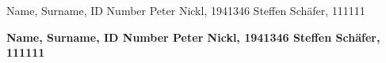 \documentclass
[twoside,english,colorbacktitle,accentcolor=tud9c]
{tudexercise}
\newcommand{\studentdata}{Peter Nickl, 1941346 \qquad Steffen Schäfer, 111111}
\begin{document}
	
	\hwtitle{}
	\maketitle
	
	\begin{examheader}
		\normalsize
		\vspace{-1em}
		Name, Surname, ID Number \hfill \studentdata{}
		\vspace{-1em}
	\end{examheader} 
	
	\textbf{Name, Surname, ID Number \hfill \studentdata{}}

	
	
	
	
	
\end{document}
